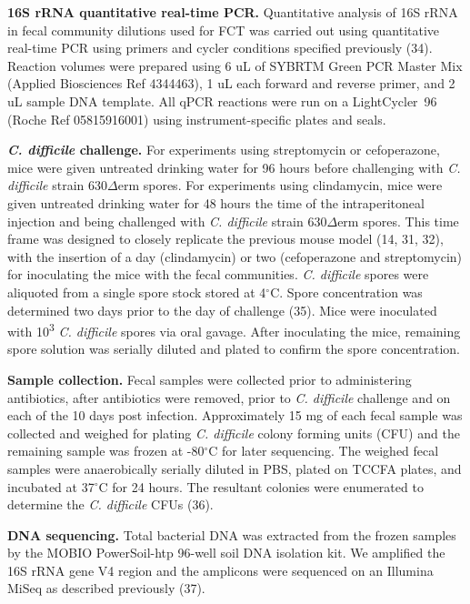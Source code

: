 \documentclass[
  12pt,
]{article}
\begin{document}
\textbf{16S rRNA quantitative real-time PCR.} Quantitative analysis of
16S rRNA in fecal community dilutions used for FCT was carried out using
quantitative real-time PCR using primers and cycler conditions specified
previously (34). Reaction volumes were prepared using 6 uL of SYBRTM
Green PCR Master Mix (Applied Biosciences Ref 4344463), 1 uL each
forward and reverse primer, and 2 uL sample DNA template. All qPCR
reactions were run on a LightCycler\textregistered ~96 (Roche Ref
05815916001) using instrument-specific plates and seals.

\textbf{\emph{C. difficile} challenge.} For experiments using
streptomycin or cefoperazone, mice were given untreated drinking water
for 96 hours before challenging with \emph{C. difficile} strain
630\(\Delta\)erm spores. For experiments using clindamycin, mice were
given untreated drinking water for 48 hours the time of the
intraperitoneal injection and being challenged with \emph{C. difficile}
strain 630\(\Delta\)erm spores. This time frame was designed to closely
replicate the previous mouse model (14, 31, 32), with the insertion of a
day (clindamycin) or two (cefoperazone and streptomycin) for inoculating
the mice with the fecal communities. \emph{C. difficile} spores were
aliquoted from a single spore stock stored at 4\(^\circ\)C. Spore
concentration was determined two days prior to the day of challenge
(35). Mice were inoculated with 10\textsuperscript{3} \emph{C.
difficile} spores via oral gavage. After inoculating the mice, remaining
spore solution was serially diluted and plated to confirm the spore
concentration.

\textbf{Sample collection.} Fecal samples were collected prior to
administering antibiotics, after antibiotics were removed, prior to
\emph{C. difficile} challenge and on each of the 10 days post infection.
Approximately 15 mg of each fecal sample was collected and weighed for
plating \emph{C. difficile} colony forming units (CFU) and the remaining
sample was frozen at -80\(^\circ\)C for later sequencing. The weighed
fecal samples were anaerobically serially diluted in PBS, plated on
TCCFA plates, and incubated at 37\(^\circ\)C for 24 hours. The resultant
colonies were enumerated to determine the \emph{C. difficile} CFUs (36).

\textbf{DNA sequencing.} Total bacterial DNA was extracted from the
frozen samples by the MOBIO PowerSoil-htp 96-well soil DNA isolation
kit. We amplified the 16S rRNA gene V4 region and the amplicons were
sequenced on an Illumina MiSeq as described previously (37).
\end{document}
